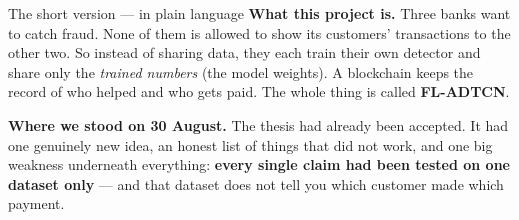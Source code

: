 \documentclass[11pt]{article}
\begin{document}
\begin{keybox}{The short version --- in plain language}
\small
\textbf{What this project is.} Three banks want to catch fraud. None of them is allowed to show its
customers' transactions to the other two. So instead of sharing data, they each train their own
detector and share only the \emph{trained numbers} (the model weights). A blockchain keeps the record
of who helped and who gets paid. The whole thing is called \textbf{FL-ADTCN}.

\smallskip
\textbf{Where we stood on 30 August.} The thesis had already been accepted. It had one genuinely new
idea, an honest list of things that did not work, and one big weakness underneath everything:
\textbf{every single claim had been tested on one dataset only} --- and that dataset does not tell you
which customer made which payment.


\end{keybox}
\end{document}
